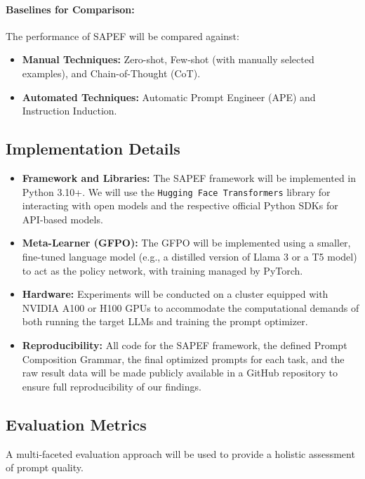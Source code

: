 \documentclass{article}
\begin{document}
\paragraph{Baselines for Comparison:}
The performance of SAPEF will be compared against:
\begin{itemize}
    \item \textbf{Manual Techniques:} Zero-shot, Few-shot (with manually selected examples), and Chain-of-Thought (CoT).
    \item \textbf{Automated Techniques:} Automatic Prompt Engineer (APE) and Instruction Induction.
\end{itemize}

\subsection{Implementation Details}
\begin{itemize}
    \item \textbf{Framework and Libraries:} The SAPEF framework will be implemented in Python 3.10+. We will use the \texttt{Hugging Face Transformers} library for interacting with open models and the respective official Python SDKs for API-based models.
    \item \textbf{Meta-Learner (GFPO):} The GFPO will be implemented using a smaller, fine-tuned language model (e.g., a distilled version of Llama 3 or a T5 model) to act as the policy network, with training managed by PyTorch.
    \item \textbf{Hardware:} Experiments will be conducted on a cluster equipped with NVIDIA A100 or H100 GPUs to accommodate the computational demands of both running the target LLMs and training the prompt optimizer.
    \item \textbf{Reproducibility:} All code for the SAPEF framework, the defined Prompt Composition Grammar, the final optimized prompts for each task, and the raw result data will be made publicly available in a GitHub repository to ensure full reproducibility of our findings.
\end{itemize}

\subsection{Evaluation Metrics}
A multi-faceted evaluation approach will be used to provide a holistic assessment of prompt quality.
\end{document}
